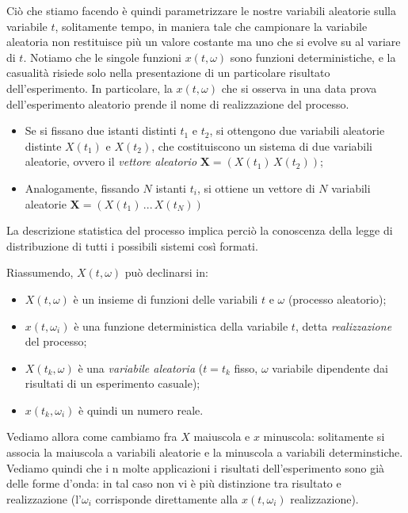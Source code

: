 \documentclass[a4paper,11pt]{article}
\begin{document}
Ciò che stiamo facendo è quindi parametrizzare le nostre variabili aleatorie sulla variabile $t$, solitamente tempo, in maniera tale che campionare la variabile aleatoria non restituisce più un valore costante ma uno che si evolve su al variare di $t$. Notiamo che le singole funzioni $x(t, \omega)$ sono funzioni deterministiche, e la casualità risiede solo nella presentazione di un particolare risultato dell’esperimento. In particolare, la $x(t, \omega)$ che si osserva in una data prova dell’esperimento aleatorio prende il nome di realizzazione del processo.

\begin{itemize}
	\item Se si fissano due istanti distinti $t_1$ e $t_2$, si ottengono due variabili aleatorie distinte $X(t_1)$ e $X(t_2)$, che costituiscono un sistema di due variabili aleatorie, ovvero il \textit{vettore aleatorio} $\mathbf{X} = ( X(t_1) \, X(t_2) )$;
	\item Analogamente, fissando $N$ istanti $t_i$, si ottiene un vettore di $N$ variabili aleatorie $\mathbf{X} = ( X(t_1) \, ... \, X(t_N) )$
\end{itemize}

La descrizione statistica del processo implica perciò la conoscenza della legge di distribuzione di tutti i possibili sistemi così formati.

Riassumendo, $X(t, \omega)$ può declinarsi in:
\begin{itemize}
	\item $X(t, \omega)$ è un insieme di funzioni delle variabili $t$ e $\omega$ (processo aleatorio);
	\item $x(t, \omega_i)$ è una funzione deterministica della variabile $t$, detta \textit{realizzazione} del processo;
	\item $X(t_k, \omega)$ è una \textit{variabile aleatoria} ($t = t_k$ fisso, $\omega$ variabile dipendente dai risultati di un esperimento casuale);
	\item $x(t_k, \omega_i)$ è quindi un numero reale.
\end{itemize}
Vediamo allora come cambiamo fra $X$ maiuscola e $x$ minuscola: solitamente si associa la maiuscola a variabili aleatorie e la minuscola a variabili determinstiche. Vediamo quindi che i n molte applicazioni i risultati dell’esperimento sono già delle forme d’onda: in tal caso non vi è più distinzione tra risultato e realizzazione (l'$\omega_i$ corrisponde direttamente alla $x(t, \omega_i)$ realizzazione).
\end{document}
